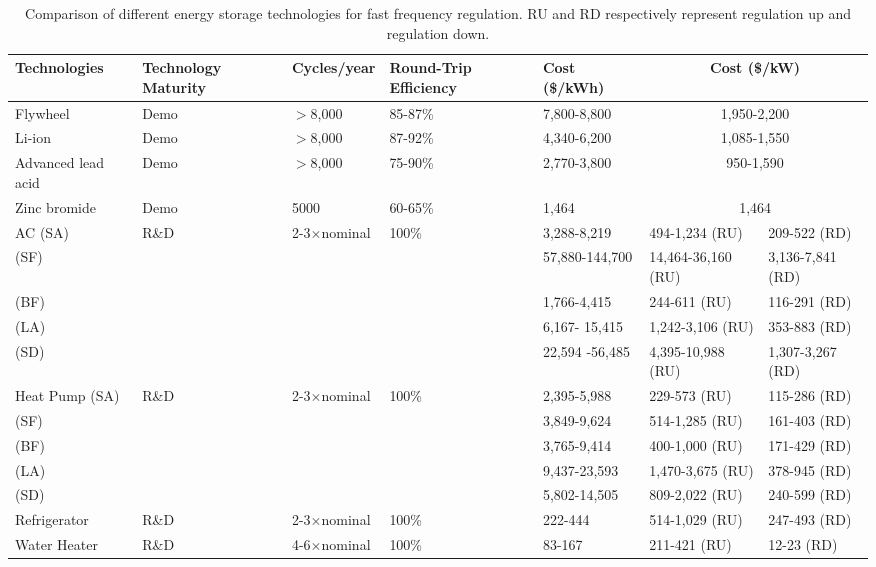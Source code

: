 \documentclass[onecolumn,journal]{IEEEtran}
\begin{document}
\begin{table*}
\caption{Comparison of different energy storage technologies for fast frequency regulation. RU and RD respectively represent regulation up and regulation down.}
\label{tab:comparison}
\vspace{6pt}
{\scriptsize
\begin{tabular}{p{1.115in}||p{0.5in}p{0.7in}p{0.565in}p{0.72in}p{0.93in}p{0.82in}}
Technologies & Technology Maturity   & Cycles/year  & Round-Trip Efficiency  & Cost (\$/kWh) &  \multicolumn{2}{c}{Cost (\$/kW)}  \\\hline \hline
Flywheel   \cite{rastler2010electricity}  & Demo  & $>$8,000 & 85-87\%  & 7,800-8,800 & \multicolumn{2}{c}{1,950-2,200}  \\ 
 Li-ion     \cite{rastler2010electricity}     & Demo   & $>$8,000 & 87-92\%  & 4,340-6,200 & \multicolumn{2}{c}{1,085-1,550}  \\
Advanced lead acid  \cite{rastler2010electricity} & Demo   & $>$8,000 & 75-90\%  & 2,770-3,800 & \multicolumn{2}{c}{950-1,590} \\
Zinc bromide     \cite{sandia_storage}     & Demo    & 5000 & 60-65\%  & 1,464 & \multicolumn{2}{c}{1,464} \\
\hline
AC (SA)    &  R\&D  &  2-3$ \times$nominal & 100\%  &  3,288-8,219 & 494-1,234 (RU) & 209-522 (RD)\\
\hspace{11.5pt} (SF)    &    &   &   &  57,880-144,700 & 14,464-36,160 (RU) & 3,136-7,841 (RD)\\
\hspace{11.5pt}  (BF)   &    &   &   &  1,766-4,415 & 244-611 (RU) & 116-291 (RD)\\
\hspace{11.5pt}  (LA)   &   &   &   &  6,167- 15,415 & 1,242-3,106 (RU) & 353-883 (RD)\\
\hspace{11.5pt} (SD)  &    &   &  &  22,594 -56,485 &  4,395-10,988 (RU) & 1,307-3,267 (RD)\\
Heat Pump   (SA)       &   R\&D & 2-3$ \times$nominal  & 100\%  &  2,395-5,988 & 229-573 (RU)  & 115-286 (RD)\\
\hspace{40pt}   (SF)       &    &   &  &  3,849-9,624 & 514-1,285 (RU)  & 161-403 (RD)\\
\hspace{40pt}   (BF)       &    &  &   &  3,765-9,414 & 400-1,000 (RU)  & 171-429 (RD)\\
\hspace{40pt}   (LA)       &    &   &   &  9,437-23,593 & 1,470-3,675 (RU)  & 378-945 (RD)\\
\hspace{40pt}   (SD)       &   &   &   &  5,802-14,505 & 809-2,022 (RU)  & 240-599 (RD)\\
Refrigerator          &  R\&D  &  2-3$ \times$nominal & 100\%  &  222-444 & 514-1,029 (RU) & 247-493 (RD)\\
Water Heater        &  R\&D  &  4-6$ \times$nominal & 100\%  &83-167 & 211-421 (RU)  &12-23  (RD) 
\end{tabular}
}
\end{table*}
\end{document}
